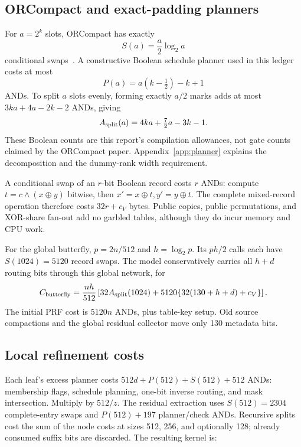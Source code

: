 \documentclass[11pt]{article}
\newcommand{\xor}{\mathbin{\oplus}}
\newcommand{\AND}{\mathbin{\wedge}}
\begin{document}
\subsection{ORCompact and exact-padding planners}
For $a=2^k$ slots, ORCompact has exactly
\begin{equation}
 S(a)=\frac a2\log_2a
\end{equation}
conditional swaps~\cite{orcompact}. A constructive Boolean schedule planner
used in this ledger costs at most
\begin{equation}
 P(a)=a(k-\tfrac12)-k+1
\end{equation}
ANDs. To split $a$ slots evenly, forming exactly $a/2$ marks adds at most
$3ka+4a-2k-2$ ANDs, giving
\begin{equation}
 A_{\rm split}(a)=4ka+\tfrac72a-3k-1.
\end{equation}
These Boolean counts are this report's compilation allowances, not gate
counts claimed by the ORCompact paper. Appendix~\ref{app:planner} explains
the decomposition and the dummy-rank width requirement.

A conditional swap of an $r$-bit Boolean record costs $r$ ANDs: compute
$t=c\AND(x\xor y)$ bitwise, then $x'=x\xor t,y'=y\xor t$.
The complete mixed-record operation therefore costs $32r+c_V$ bytes.
Public copies, public permutations, and XOR-share fan-out add no garbled
tables, although they do incur memory and CPU work.

For the global butterfly, $p=2n/512$ and $h=\log_2p$. Its $ph/2$ calls
each have $S(1024)=5120$ record swaps. The model conservatively carries
all $h+d$ routing bits through this global network, for
\begin{equation}
 C_{\rm butterfly}=
 \frac{nh}{512}\left[32A_{\rm split}(1024)
              +5120\{32(130+h+d)+c_V\}\right].
\end{equation}
The initial PRF cost is $5120n$ ANDs, plus table-key setup. Old source
compactions and the global residual collector move only 130 metadata bits.

\subsection{Local refinement costs}
Each leaf's excess planner costs
$512d+P(512)+S(512)+512$ ANDs: membership flags, schedule planning,
one-bit inverse routing, and mask intersection. Multiply by $512/z$.
The residual extraction uses $S(512)=2304$ complete-entry swaps and
$P(512)+197$ planner/check ANDs. Recursive splits cost the sum of the
node costs at sizes 512, 256, and optionally 128; already consumed suffix
bits are discarded. The resulting kernel is:
\end{document}
